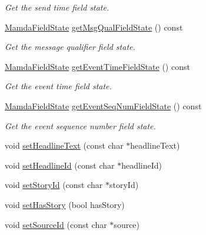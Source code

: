 \begin{CompactItemize}
\begin{CompactList}\small\item\em Get the send time field state. \item\end{CompactList}\item 
\hyperlink{namespaceWombat_93aac974f2ab713554fd12a1fa3b7d2a}{Mamda\-Field\-State} \hyperlink{classWombat_1_1MamdaNewsHeadline_dccb147f13eb839ad4c8e69afe20c3be}{get\-Msg\-Qual\-Field\-State} () const 
\begin{CompactList}\small\item\em Get the message qualifier field state. \item\end{CompactList}\item 
\hyperlink{namespaceWombat_93aac974f2ab713554fd12a1fa3b7d2a}{Mamda\-Field\-State} \hyperlink{classWombat_1_1MamdaNewsHeadline_bf7d4aed46483085ed6a4eac39d2f142}{get\-Event\-Time\-Field\-State} () const 
\begin{CompactList}\small\item\em Get the event time field state. \item\end{CompactList}\item 
\hyperlink{namespaceWombat_93aac974f2ab713554fd12a1fa3b7d2a}{Mamda\-Field\-State} \hyperlink{classWombat_1_1MamdaNewsHeadline_b1c8d44cfd952aa946279968591b3113}{get\-Event\-Seq\-Num\-Field\-State} () const 
\begin{CompactList}\small\item\em Get the event sequence number field state. \item\end{CompactList}\item 
void \hyperlink{classWombat_1_1MamdaNewsHeadline_e9ed0ca22678a7c555027f7b16c5c060}{set\-Headline\-Text} (const char $\ast$headline\-Text)
\item 
void \hyperlink{classWombat_1_1MamdaNewsHeadline_b0c2bc4354f0d68aba4eba1fc173f635}{set\-Headline\-Id} (const char $\ast$headline\-Id)
\item 
void \hyperlink{classWombat_1_1MamdaNewsHeadline_c45497cfe5d556c3dda648489c025b6a}{set\-Story\-Id} (const char $\ast$story\-Id)
\item 
void \hyperlink{classWombat_1_1MamdaNewsHeadline_74ac75438bdf3e53495dd1c46593158f}{set\-Has\-Story} (bool has\-Story)
\item 
void \hyperlink{classWombat_1_1MamdaNewsHeadline_945595e4cf59801051732152fe04e4d6}{set\-Source\-Id} (const char $\ast$source)

\end{CompactItemize}
